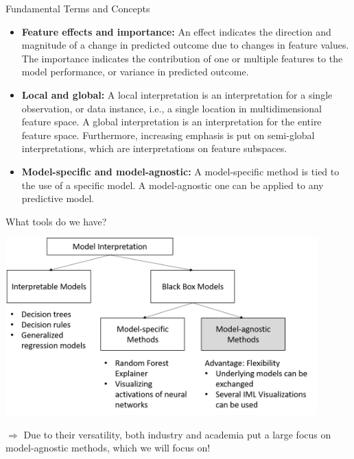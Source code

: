 \documentclass[11pt,compress,t,notes=noshow, xcolor=table]{beamer}
\begin{document}
\begin{vbframe}{Fundamental Terms and Concepts}
\begin{itemize}
\itemsep1em
\item \textbf{Feature effects and importance:} An effect indicates the direction and magnitude of a change in predicted outcome due to changes in feature values. The importance indicates the contribution of one or multiple features to the model performance, or variance in predicted outcome.
\item \textbf{Local and global:} A local interpretation is an interpretation for a single observation, or data instance, i.e., a single location in multidimensional feature space. A global interpretation is an interpretation for the entire feature space. Furthermore, increasing emphasis is put on semi-global interpretations, which are interpretations on feature subspaces.
\item \textbf{Model-specific and model-agnostic:} A model-specific method is tied to the use of a specific model. A model-agnostic one can be applied to any predictive model.
\end{itemize}
\end{vbframe}

\begin{vbframe}{What tools do we have?}
 \begin{center}
  \includegraphics[width=0.9\textwidth]{figure/overview}
 \end{center}
 $\Rightarrow$ Due to their versatility, both industry and academia put a large focus on model-agnostic methods, which we will focus on!
\end{vbframe}
\end{document}
